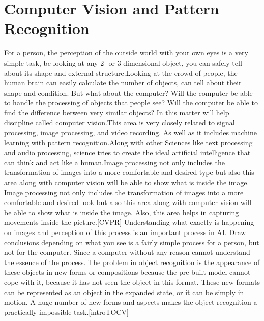 \section{Computer Vision and Pattern Recognition} \label{sec:3.2}
\par For a person, the perception of the outside world with your own eyes is a very simple task, be looking at any 2- or 3-dimensional object, you can safely tell about its shape and external structure.Looking at the crowd of people, the human brain can easily calculate the number of objects, can tell about their shape and condition. But what about the computer? Will the computer be able to handle the processing of objects that people see? Will the computer be able to find the difference between very similar objects? In this matter will help discipline called computer vision.This area is very closely related to signal processing, image processing, and video recording. As well as it includes machine learning with pattern recognition.Along with other Sciences like text processing and audio processing, science tries to create the ideal artificial intelligence that can think and act like a human.Image processing not only includes the transformation of images into a more comfortable and desired type but also this area along with computer vision will be able to show what is inside the image. Image processing not only includes the transformation of images into a more comfortable and desired look but also this area along with computer vision will be able to show what is inside the image. Also, this area helps in capturing movements inside the picture.[CVPR]
Understanding what exactly is happening on images and perception of this process is an important process in AI. Draw conclusions depending on what you see is a fairly simple process for a person, but not for the computer. Since a computer without any reason cannot understand the essence of the process. The problem in object recognition is the appearance of these objects in new forms or compositions because the pre-built model cannot cope with it, because it has not seen the object in this format. These new formats can be represented as an object in the expanded state, or it can be simply in motion. A huge number of new forms and aspects makes the object recognition a practically impossible task.[introTOCV]

\vspace{-0.3cm}



